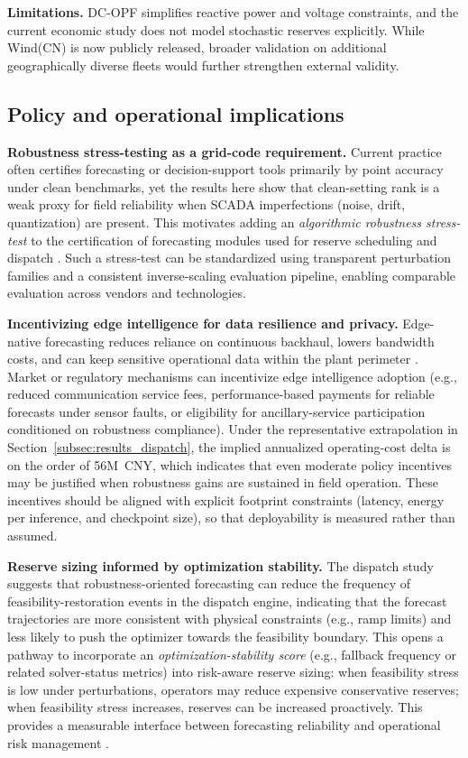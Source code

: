 \documentclass[review,3p,times]{elsarticle}
\begin{document}
\textbf{Limitations.}
DC-OPF simplifies reactive power and voltage constraints, and the current economic study does not model stochastic reserves explicitly.
While Wind(CN) is now publicly released, broader validation on additional geographically diverse fleets would further strengthen external validity.



\subsection{Policy and operational implications}
\label{subsec:policy}
\textbf{Robustness stress-testing as a grid-code requirement.} Current practice often certifies forecasting or decision-support tools primarily by point accuracy under clean benchmarks, yet the results here show that clean-setting rank is a weak proxy for field reliability when SCADA imperfections (noise, drift, quantization) are present. This motivates adding an \emph{algorithmic robustness stress-test} to the certification of forecasting modules used for reserve scheduling and dispatch \cite{wang2025review,liao2024trust}. Such a stress-test can be standardized using transparent perturbation families and a consistent inverse-scaling evaluation pipeline, enabling comparable evaluation across vendors and technologies.

\textbf{Incentivizing edge intelligence for data resilience and privacy.} Edge-native forecasting reduces reliance on continuous backhaul, lowers bandwidth costs, and can keep sensitive operational data within the plant perimeter \cite{houben2023optimal}. Market or regulatory mechanisms can incentivize edge intelligence adoption (e.g., reduced communication service fees, performance-based payments for reliable forecasts under sensor faults, or eligibility for ancillary-service participation conditioned on robustness compliance). Under the representative extrapolation in Section~\ref{subsec:results_dispatch}, the implied annualized operating-cost delta is on the order of 56M~CNY, which indicates that even moderate policy incentives may be justified when robustness gains are sustained in field operation. These incentives should be aligned with explicit footprint constraints (latency, energy per inference, and checkpoint size), so that deployability is measured rather than assumed.

\textbf{Reserve sizing informed by optimization stability.} The dispatch study suggests that robustness-oriented forecasting can reduce the frequency of feasibility-restoration events in the dispatch engine, indicating that the forecast trajectories are more consistent with physical constraints (e.g., ramp limits) and less likely to push the optimizer towards the feasibility boundary. This opens a pathway to incorporate an \emph{optimization-stability score} (e.g., fallback frequency or related solver-status metrics) into risk-aware reserve sizing: when feasibility stress is low under perturbations, operators may reduce expensive conservative reserves; when feasibility stress increases, reserves can be increased proactively. This provides a measurable interface between forecasting reliability and operational risk management \cite{chen2022intelligent}.
\end{document}
